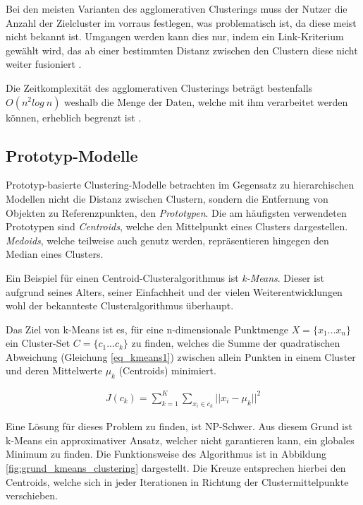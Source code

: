 Bei den meisten Varianten des agglomerativen Clusterings muss der Nutzer die Anzahl der Zielcluster im
vorraus festlegen, was problematisch ist, da diese meist nicht bekannt ist. Umgangen werden kann dies nur,
indem ein Link-Kriterium gewählt wird, das ab einer bestimmten Distanz zwischen den Clustern diese nicht weiter
fusioniert \cite[]{GeorgeSeif2018}.

Die Zeitkomplexität des agglomerativen Clusterings beträgt bestenfalls $O(n^2log\ n)$ weshalb die Menge der Daten,
welche mit ihm verarbeitet werden können, erheblich begrenzt ist \cite[]{tan2007introduction}.

\subsection{Prototyp-Modelle}
\label{sec:grund_prototype_clustering}

Prototyp-basierte Clustering-Modelle betrachten im Gegensatz zu hierarchischen Modellen nicht die Distanz
zwischen Clustern, sondern die Entfernung von Objekten zu Referenzpunkten, den \textit{Prototypen}.
Die am häufigsten verwendeten Prototypen sind \textit{Centroids}, welche den Mittelpunkt eines Clusters dargestellen.
\textit{Medoids}, welche teilweise auch genutz werden, repräsentieren hingegen den Median eines Clusters.

Ein Beispiel für einen Centroid-Clusteralgorithmus ist \textit{k-Means}. Dieser ist aufgrund seines Alters,
seiner Einfachheit und der vielen Weiterentwicklungen wohl der bekannteste Clusteralgorithmus überhaupt.

Das Ziel von k-Means ist es, für eine n-dimensionale Punktmenge $X = \{ x_1 ... x_n \}$ ein Cluster-Set $C = \{ c_1 ... c_k \}$
zu finden, welches die Summe der quadratischen Abweichung (Gleichung \ref{eq_kmeans1}) zwischen allein Punkten in einem Cluster und deren
Mittelwerte $\mu_k$ (Centroids) minimiert.

\begin{ceqn}
\begin{align}
    \label{eq_kmeans1}
    J(c_k) = \sum_{k=1}^K \sum_{x_i \in c_k} || x_i - \mu_k ||^2
\end{align}
\end{ceqn}

Eine Lösung für dieses Problem zu finden, ist NP-Schwer. Aus diesem Grund
ist k-Means ein approximativer Ansatz, welcher nicht garantieren kann, ein globales Minimum zu finden.
Die Funktionsweise des Algorithmus ist in Abbildung \ref{fig:grund_kmeans_clustering} dargestellt.
Die Kreuze entsprechen hierbei den Centroids, welche sich in jeder Iterationen in Richtung der
Clustermittelpunkte verschieben.


